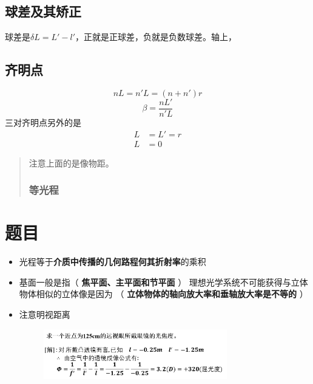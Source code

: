 \subsection{球差及其矫正}
球差是$\delta L=L'-l'$，正就是正球差，负就是负数球差。轴上，
\subsection{齐明点}
\begin{equation}
     nL=n'L=(n+n')r \tag{6.7.1}
\end{equation}
\begin{equation}
\beta=\frac{nL'}{n'L} \tag{6.7.2}
\end{equation}
三对齐明点另外的是
\begin{align}
 L&=L'=r \tag{6.7.3.a}\\
 L&=0   
\end{align}
\begin{quote}
{\qquad{}\ccwd\kaishu{}
注意上面的是像物距。
}
\subsubsection{等光程}
\end{quote}
\section{题目}
\begin{itemize}
\item 光程等于\textbf{介质中传播的几何路程何其折射率}的乘积
\item 基面一般是指（                    \textbf{ 焦平面、主平面和节平面}
）
理想光学系统不可能获得与立体物体相似的立体像是因为      （ \textbf{立体物体的轴向放大率和垂轴放大率是不等的
}）
\item 注意明视距离         \begin{figure}[H]
            \centering
            \includegraphics[width=8cm]{img/t1.png}
            \end{figure}
\end{itemize}
